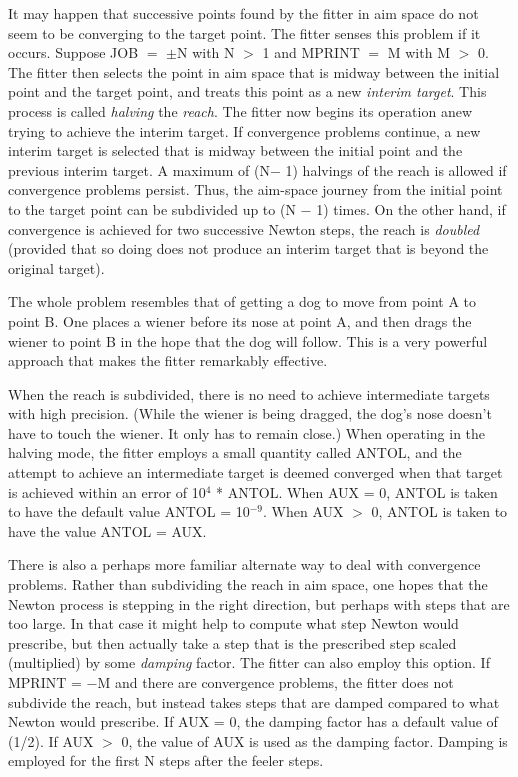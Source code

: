 It may happen that successive points found by the fitter in aim space do not seem to be converging to the target point.  The fitter senses this problem if it occurs.  Suppose JOB $=$ $\pm$N with N $>$ 1 and MPRINT $=$ M with M $>$ 0.  The fitter then selects the point in aim space that is midway between the initial point and the target point, and treats this point as a new {\em interim target}.   This process is called {\em halving} the {\em reach}.  The fitter now begins its operation anew trying to achieve the interim target.  If convergence problems continue, a new interim target is selected that is midway between the initial point and the previous interim target.  A maximum of (N$-$ 1) halvings of the reach is allowed if convergence problems persist.  Thus, the aim-space journey from the initial point to the target point can be subdivided up to (N $-$ 1) times.  On the other hand, if convergence is achieved for two successive Newton steps, the reach is {\em doubled} (provided that so doing does not produce an interim target that is beyond the original target).

The whole problem resembles that of getting a dog to move from point A to point B.  One places a wiener before its nose at point A, and then drags the wiener to point B in the hope that the dog will follow.  This is a very powerful approach that makes the \Mary fitter remarkably effective.

When the reach is subdivided, there is no need to achieve intermediate targets with high precision.  (While the wiener is being dragged, the dog's nose doesn't have to touch the wiener.  It only has to remain close.)  When operating in the halving mode, the fitter employs a small quantity called ANTOL, and the attempt to achieve an intermediate target is deemed converged when that target is achieved within an error of 10$^4$ * ANTOL.  When AUX = 0, ANTOL is taken to have the default value ANTOL = 10$^{-9}$.  When AUX $>$ 0, ANTOL is taken to have the value ANTOL = AUX.

There is also a perhaps more familiar alternate way to deal with convergence problems.  Rather than subdividing the reach in aim space, one hopes that the Newton process is stepping in the right direction, but perhaps with steps that are too large.  In that case it might help to compute what step Newton would prescribe, but then actually take a step that is the prescribed step scaled (multiplied) by some {\em damping} factor.  The \Mary fitter can also employ this option.  If MPRINT = $-$M and there are convergence problems, the fitter does not subdivide the reach, but instead takes steps that are damped compared to what Newton would prescribe.  If AUX = 0, the damping factor has a default value of (1/2).  If AUX $>$ 0, the value of AUX is used as the damping factor.  Damping is employed for the first N steps after the feeler steps.

